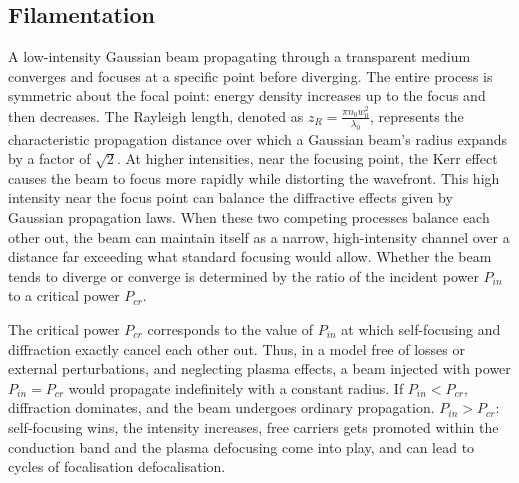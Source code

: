 \subsection{Filamentation}

A low-intensity Gaussian beam propagating through a transparent medium converges and focuses at a specific point before diverging. The entire process is symmetric about the focal point: energy density increases up to the focus and then decreases. The Rayleigh length, denoted as $z_R = \frac{\pi n_0 w_0^2}{\lambda_0}$, represents the characteristic propagation distance over which a Gaussian beam's radius expands by a factor of $\sqrt{2}$. 
At higher intensities, near the focusing point, the Kerr effect causes the beam to focus more rapidly while distorting the wavefront. This high intensity near the focus point can balance the diffractive effects given by Gaussian propagation laws.
When these two competing processes balance each other out, the beam can maintain itself as a narrow, high-intensity channel over a distance far exceeding what standard focusing would allow. Whether the beam tends to diverge or converge is determined by the ratio of the incident power $P_{in}$ to a critical power $P_{cr}$.

The critical power $P_{cr}$ corresponds to the value of $P_{in}$ at which self-focusing and diffraction exactly cancel each other out. Thus, in a model free of losses or external perturbations, and neglecting plasma effects, a beam injected with power $P_{in} = P_{cr}$ would propagate indefinitely with a constant radius. If $P_{in} < P_{cr}$, diffraction dominates, and the beam undergoes ordinary propagation. $P_{in}>P_{cr}$: self-focusing wins, the intensity increases, free carriers gets promoted within the conduction band and the plasma defocusing come into play, and can lead to cycles of focalisation defocalisation. 

